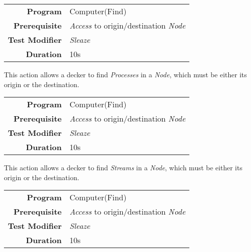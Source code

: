 \label{par:find process}


\begin{tabular}{rl}
    \textbf{Program}       & Computer(Find)                                  \\
    \textbf{Prerequisite}  & \emph{Access} to origin/destination \emph{Node} \\
    \textbf{Test Modifier} & \emph{Sleaze}                                   \\
    \textbf{Duration}      & 10s                                             \\
\end{tabular}

\hfill

This action allows a decker to find \emph{Processes} in a \emph{Node}, which must be either its
origin or the destination.

\label{par:find stream}


\begin{tabular}{rl}
    \textbf{Program}       & Computer(Find)                                  \\
    \textbf{Prerequisite}  & \emph{Access} to origin/destination \emph{Node} \\
    \textbf{Test Modifier} & \emph{Sleaze}                                   \\
    \textbf{Duration}      & 10s                                             \\
\end{tabular}

\hfill

This action allows a decker to find \emph{Streams} in a \emph{Node}, which must be either its
origin or the destination.

\label{par:find file}

\begin{tabular}{rl}
    \textbf{Program}       & Computer(Find)                                  \\
    \textbf{Prerequisite}  & \emph{Access} to origin/destination \emph{Node} \\
    \textbf{Test Modifier} & \emph{Sleaze}                                   \\
    \textbf{Duration}      & 10s                                             \\
\end{tabular}

